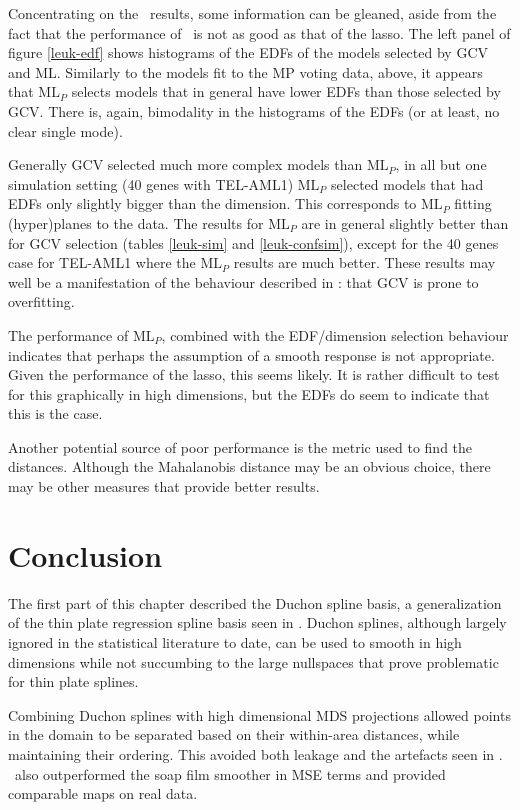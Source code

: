 Concentrating on the \mdsds\ results, some information can be gleaned, aside from the fact that the performance of \mdsds\  is not as good as that of the lasso. The left panel of figure \ref{leuk-edf} shows histograms of the EDFs of the models selected by GCV and ML. Similarly to the models fit to the MP voting data, above, it appears that $\text{ML}_P$ selects models that in general have lower EDFs than those selected by GCV. There is, again, bimodality in the histograms of the EDFs (or at least, no clear single mode). 

Generally GCV selected much more complex models than $\text{ML}_P$, in all but one simulation setting (40 genes with TEL-AML1) $\text{ML}_P$ selected models that had EDFs only slightly bigger than the dimension. This corresponds to $\text{ML}_P$ fitting (hyper)planes to the data. The results for $\text{ML}_P$ are in general slightly better than for GCV selection (tables \ref{leuk-sim} and \ref{leuk-confsim}), except for the 40 genes case for TEL-AML1 where the $\text{ML}_P$ results are much better. These results may well be a manifestation of the behaviour described in : that GCV is prone to overfitting.

The performance of $\text{ML}_P$, combined with the EDF/dimension selection behaviour indicates that perhaps the assumption of a smooth response is not appropriate. Given the performance of the lasso, this seems likely. It is rather difficult to test for this graphically in high dimensions, but the EDFs do seem to indicate that this is the case.

Another potential source of poor performance is the metric used to find the distances. Although the Mahalanobis distance may be an obvious choice, there may be other measures that provide better results.


\section{Conclusion}
\label{gds-gds-conc}

The first part of this chapter described the Duchon spline basis, a generalization of the thin plate regression spline basis seen in . Duchon splines, although largely ignored in the statistical literature to date, can be used to smooth in high dimensions while not succumbing to the large nullspaces that prove problematic for thin plate splines.

Combining Duchon splines with high dimensional MDS projections allowed points in the domain to be separated based on their within-area distances, while maintaining their ordering. This avoided both leakage and the artefacts seen in . \mdsds\ also outperformed the soap film smoother in MSE terms and provided comparable maps on real data.

